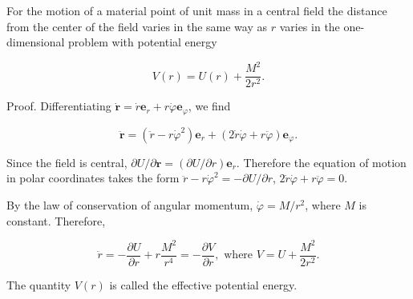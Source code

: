 For the motion of a material point of unit mass in a central field the distance from the center of the field varies in the same way as $r$ varies in the one-dimensional problem with potential energy

$$V(r) = U(r) + \frac{M^2}{2r^2}.$$

Proof. Differentiating $\dot{\mathbf{r}} = \dot{r}\mathbf{e}_r + r\dot{\varphi}\mathbf{e}_\varphi$, we find

$$\ddot{\mathbf{r}} = (\ddot{r} - r\dot{\varphi}^2)\mathbf{e}_r + (2\dot{r}\dot{\varphi} + r\ddot{\varphi})\mathbf{e}_\varphi.$$

Since the field is central, $\partial U/\partial \mathbf{r} = (\partial U/\partial r)\mathbf{e}_r$. Therefore the equation of motion in polar coordinates takes the form $\ddot{r} - r\dot{\varphi}^2 = -\partial U/\partial r$, $2\dot{r}\dot{\varphi} + r\ddot{\varphi} = 0$.

By the law of conservation of angular momentum, $\dot{\varphi} = M/r^2$, where $M$ is constant. Therefore,

$$\ddot{r} = -\frac{\partial U}{\partial r} + r \frac{M^2}{r^4} = -\frac{\partial V}{\partial r}, \text{ where } V = U + \frac{M^2}{2r^2}.$$

The quantity $V(r)$ is called the effective potential energy.
